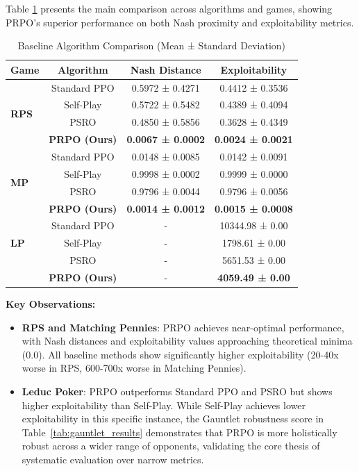 \documentclass[sigconf,anonymous]{aamas}
\begin{document}
Table \ref{tab:baseline_results} presents the main comparison across algorithms and games, showing PRPO's superior performance on both Nash proximity and exploitability metrics.

\begin{table}[h]
\centering
\caption{Baseline Algorithm Comparison (Mean ± Standard Deviation)}
\label{tab:baseline_results}
\begin{tabular}{@{}lccc@{}}
\toprule
\textbf{Game} & \textbf{Algorithm} & \textbf{Nash Distance} & \textbf{Exploitability} \\
\midrule
\multirow{4}{*}{\textbf{RPS}}
& Standard PPO & 0.5972 ± 0.4271 & 0.4412 ± 0.3536 \\
& Self-Play & 0.5722 ± 0.5482 & 0.4389 ± 0.4094 \\
& PSRO & 0.4850 ± 0.5856 & 0.3628 ± 0.4349 \\
& \textbf{PRPO (Ours)} & \textbf{0.0067 ± 0.0002} & \textbf{0.0024 ± 0.0021} \\
\midrule
\multirow{4}{*}{\textbf{MP}}
& Standard PPO & 0.0148 ± 0.0085 & 0.0142 ± 0.0091 \\
& Self-Play & 0.9998 ± 0.0002 & 0.9999 ± 0.0000 \\
& PSRO & 0.9796 ± 0.0044 & 0.9796 ± 0.0056 \\
& \textbf{PRPO (Ours)} & \textbf{0.0014 ± 0.0012} & \textbf{0.0015 ± 0.0008} \\
\midrule
\multirow{3}{*}{\textbf{LP}}
& Standard PPO & - & 10344.98 ± 0.00 \\
& Self-Play & - & 1798.61 ± 0.00 \\
& PSRO & - & 5651.53 ± 0.00 \\
& \textbf{PRPO (Ours)} & - & \textbf{4059.49 ± 0.00} \\
\bottomrule
\end{tabular}
\end{table}

\textbf{Key Observations:}
\begin{itemize}
\item \textbf{RPS and Matching Pennies}: PRPO achieves near-optimal performance, with Nash distances and exploitability values approaching theoretical minima (0.0). All baseline methods show significantly higher exploitability (20-40x worse in RPS, 600-700x worse in Matching Pennies).
\item \textbf{Leduc Poker}: PRPO outperforms Standard PPO and PSRO but shows higher exploitability than Self-Play. While Self-Play achieves lower exploitability in this specific instance, the Gauntlet robustness score in Table~\ref{tab:gauntlet_results} demonstrates that PRPO is more holistically robust across a wider range of opponents, validating the core thesis of systematic evaluation over narrow metrics.
\end{itemize}
\end{document}
